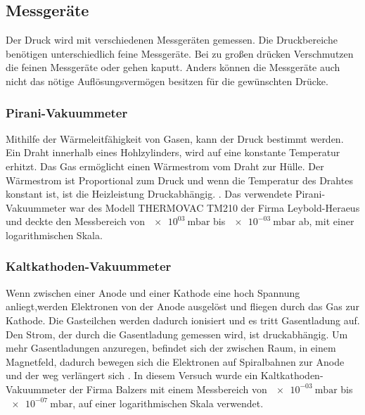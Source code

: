 \subsection{Messgeräte}
Der Druck wird mit verschiedenen Messgeräten gemessen. Die Druckbereiche benötigen unterschiedlich feine Messgeräte. Bei zu großen drücken Verschmutzen die feinen Messgeräte oder gehen kaputt. Anders können die Messgeräte auch nicht das nötige Auflösungsvermögen besitzen für die gewünschten Drücke.
\subsubsection{Pirani-Vakuummeter}
Mithilfe der Wärmeleitfähigkeit von Gasen, kann der Druck bestimmt werden. Ein Draht innerhalb eines Hohlzylinders, wird auf eine konstante Temperatur erhitzt. Das Gas ermöglicht einen Wärmestrom vom Draht zur Hülle. Der Wärmestrom ist Proportional zum Druck und wenn die Temperatur des Drahtes konstant ist, ist die Heizleistung Druckabhängig. %
\cite{Pfeifer13}.
Das verwendete Pirani-Vakuummeter war des Modell THERMOVAC TM210 der Firma 
Leybold-Heraeus und deckte den Messbereich von $\SI{e03}{\milli\bar}$ bis $\SI{e-03}{\milli\bar}$ ab, mit einer logarithmischen Skala.    


\subsubsection{Kaltkathoden-Vakuummeter}
Wenn zwischen einer Anode und einer Kathode eine hoch Spannung anliegt,werden Elektronen von der Anode ausgelöst und fliegen durch das Gas zur Kathode. Die Gasteilchen werden dadurch ionisiert und es tritt Gasentladung auf. Den Strom, der durch die Gasentladung gemessen wird, ist druckabhängig. 
Um mehr Gasentladungen anzuregen, befindet sich der zwischen Raum, in einem Magnetfeld, dadurch bewegen sich die Elektronen auf Spiralbahnen zur Anode und der weg verlängert sich \cite{Pfeifer13}.
In diesem Versuch wurde ein Kaltkathoden-Vakuummeter der Firma Balzers
mit einem Messbereich von $\SI{e-03}{\milli\bar}$ bis $\SI{e-07}{\milli\bar}$, auf einer logarithmischen Skala verwendet.
